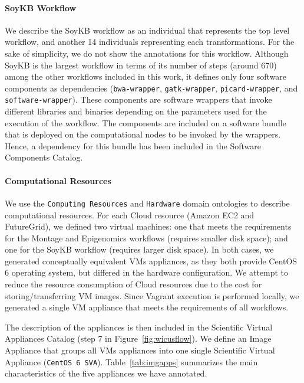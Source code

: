 \paragraph{\textbf{SoyKB Workflow}}
We describe the SoyKB workflow as an individual that represents the top level workflow,
and another 14 individuals representing each transformations. For the sake of simplicity,
we do not show the annotations for this workflow. Although SoyKB is the largest workflow 
in terms of its number of steps (around 670) among the other workflows included in this 
work, it defines only four software components as dependencies (\texttt{bwa-wrapper}, 
\texttt{gatk-wrapper}, \texttt{picard-wrapper}, and \texttt{software-wrapper}). These 
components  are software wrappers that invoke different libraries and binaries depending 
on the parameters used for the execution of the workflow. The components are included 
on a software bundle that is deployed on the computational nodes to be invoked by the 
wrappers. Hence, a dependency for this bundle has been included in the Software 
Components Catalog.


\paragraph{\textbf{Computational Resources}}
We use the \texttt{Computing Resources} and \texttt{Hardware} domain ontologies 
to describe computational resources. For each Cloud resource (Amazon EC2 and 
FutureGrid), we defined two virtual machines: one that meets the requirements for the 
Montage and Epigenomics workflows (requires smaller disk space); and one for the 
SoyKB workflow (requires larger disk space). In both cases, we generated conceptually 
equivalent VMs appliances, as they both provide CentOS 6 operating system, but differed 
in the hardware configuration. We attempt to reduce the resource consumption of
Cloud resources due to the cost for storing/transferring VM images. Since Vagrant
execution is performed locally, we generated a single VM appliance that meets the 
requirements of all workflows. 

The description of the appliances is then included in the Scientific Virtual Appliances 
Catalog (step 7 in Figure~\ref{fig:wicusflow}). We define  an Image Appliance that groups 
all VMs appliances into one single Scientific Virtual Appliance (\texttt{CentOS 6 SVA}). 
Table~\ref{tab:imgapps} summarizes the main characteristics of the five appliances 
we have annotated.

